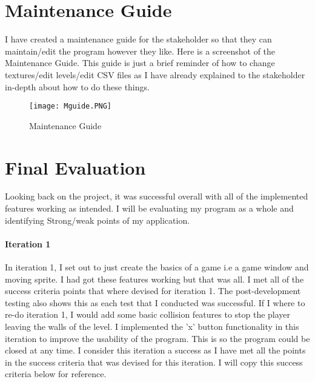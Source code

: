 \documentclass[12pt]{report}
\begin{document}
\section{Maintenance Guide}
I have created a maintenance guide for the stakeholder so that they can maintain/edit the program however they like. Here is a screenshot of the Maintenance Guide. This guide is just a brief reminder of how to change textures/edit levels/edit CSV files as I have already explained to the stakeholder in-depth about how to do these things.

\begin{figure}[H]
    \centering
    \texttt{[image: Mguide.PNG]}
    \caption{Maintenance Guide}
\end{figure}

\pagebreak

\footnotesize

\section{Final Evaluation}
Looking back on the project, it was successful overall with all of the implemented features working as intended. I will be evaluating my program as a whole and identifying Strong/weak points of my application.

\paragraph{Iteration 1}
In iteration 1, I set out to just create the basics of a game i.e a game window and moving sprite. I had got these features working but that was all. I met all of the success criteria points that where devised for iteration 1. The post-development testing also shows this as each test that I conducted was successful. If I where to re-do iteration 1, I would add some basic collision features to stop the player leaving the walls of the level. I implemented the 'x' button functionality in this iteration to improve the usability of the program. This is so the program could be closed at any time. I consider this iteration a success as I have met all the points in the success criteria that was devised for this iteration. I will copy this success criteria below for reference. 
\end{document}
